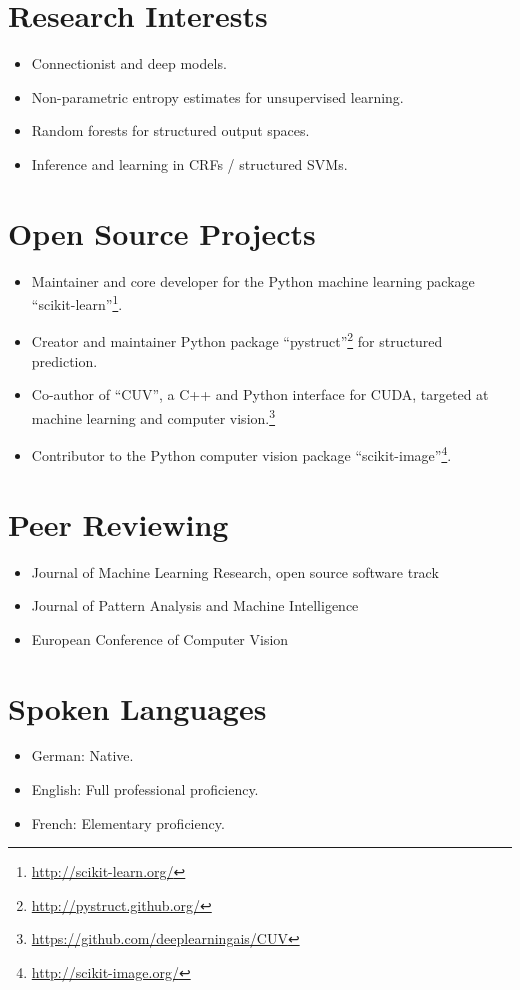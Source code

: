 \documentclass[a4paper,11pt]{article}
\begin{document}
\section{Research Interests}
\begin{itemize}
    \item Connectionist and deep models.
    \item Non-parametric entropy estimates for unsupervised learning.
    \item Random forests for structured output spaces.
    \item Inference and learning in CRFs / structured SVMs.
\end{itemize}

\section{Open Source Projects}
\begin{itemize}
    \item Maintainer and core developer for the Python machine learning package ``scikit-learn''\footnote{\url{http://scikit-learn.org/}}.
    \item Creator and maintainer Python package ``pystruct''\footnote{\url{http://pystruct.github.org/}} for structured prediction.
    \item Co-author of ``CUV'', a C++ and Python interface for CUDA,
        targeted at machine learning and computer vision.\footnote{\url{https://github.com/deeplearningais/CUV}}
    \item Contributor to the Python computer vision package ``scikit-image''\footnote{\url{http://scikit-image.org/}}.
\end{itemize}
\pagebreak

\section{Peer Reviewing}
\begin{itemize}
    \item Journal of Machine Learning Research, open source software track
    \item Journal of Pattern Analysis and Machine Intelligence
    \item European Conference of Computer Vision
\end{itemize}

\section{Spoken Languages}
\begin{itemize}
    \item German: Native.
    \item English: Full professional proficiency.
    \item French: Elementary proficiency.
\end{itemize}
\end{document}
